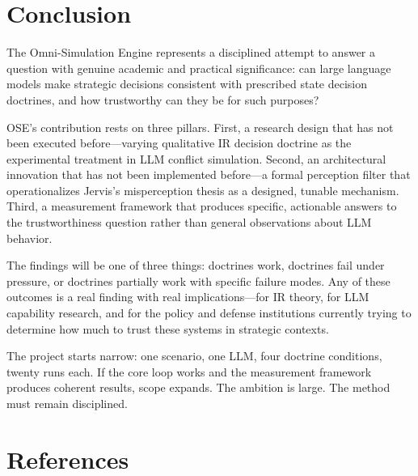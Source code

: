 \documentclass[12pt, a4paper]{article}
\begin{document}
\section{Conclusion}

The Omni-Simulation Engine represents a disciplined attempt to answer a question with genuine academic and practical significance: can large language models make strategic decisions consistent with prescribed state decision doctrines, and how trustworthy can they be for such purposes?

OSE's contribution rests on three pillars. First, a research design that has not been executed before---varying qualitative IR decision doctrine as the experimental treatment in LLM conflict simulation. Second, an architectural innovation that has not been implemented before---a formal perception filter that operationalizes Jervis's misperception thesis as a designed, tunable mechanism. Third, a measurement framework that produces specific, actionable answers to the trustworthiness question rather than general observations about LLM behavior.

The findings will be one of three things: doctrines work, doctrines fail under pressure, or doctrines partially work with specific failure modes. Any of these outcomes is a real finding with real implications---for IR theory, for LLM capability research, and for the policy and defense institutions currently trying to determine how much to trust these systems in strategic contexts.

The project starts narrow: one scenario, one LLM, four doctrine conditions, twenty runs each. If the core loop works and the measurement framework produces coherent results, scope expands. The ambition is large. The method must remain disciplined.

\section*{References}
\end{document}
